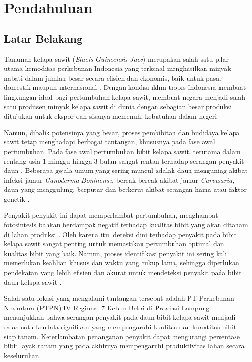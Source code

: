 \newpage
\chapter{Pendahuluan} \label{Bab I}

\section{Latar Belakang} \label{I.Latar Belakang}
Tanaman kelapa sawit (\textit{Elaeis Guineensis Jacq}) merupakan salah satu pilar utama komoditas perkebunan Indonesia yang terkenal menghasilkan minyak nabati dalam jumlah besar secara efisien dan ekonomis, baik untuk pasar domestik maupun internasional \cite{gaffar2024minyak}. Dengan kondisi iklim tropis Indonesia membuat lingkungan ideal bagi pertumbuhan kelapa sawit, membuat negara menjadi salah satu produsen minyak kelapa sawit di dunia  dengan sebagian besar produksi ditujukan untuk ekspor dan sisanya memenuhi kebutuhan dalam negeri \cite{saragih2022pengaruh}\cite{imaduddin2023analisa}.

Namun, dibalik potensinya yang besar, proses pembibitan dan budidaya kelapa sawit tetap menghadapi berbagai tantangan, khususnya pada fase awal pertumbuhan. Pada fase awal pertumbuhan bibit kelapa sawit, terutama dalam rentang usia 1 minggu hingga 3 bulan sangat rentan terhadap serangan penyakit daun \cite{syafrianda2024analisis}. Beberapa gejala umum yang sering muncul adalah daun menguning akibat infeksi jamur \textit {Ganoderma Boninense}, bercak-bercak akibat jamur \textit {Curvularia}, daun yang menggulung, berputar dan berkerut akibat serangan hama atau faktor genetik \cite{lisnawita2024peningkatan}\cite{harahap2024optimalisasi}\cite{napitupulu2022ta}\cite{marcelian2023identifikasi}. 

Penyakit-penyakit ini dapat memperlambat pertumbuhan, menghambat fotosintesis bahkan berdampak negatif terhadap kualitas bibit yang akan ditanam di lahan produksi \cite{marcelian2023identifikasi}. Oleh karena itu, deteksi dini terhadap penyakit pada bibit kelapa sawit sangat penting untuk memastikan pertumbuhan optimal dan kualitas bibit yang baik. Namun, proses identifikasi penyakit ini sering kali memerlukan keahlian khusus dan waktu yang cukup lama, sehingga diperlukan pendekatan yang lebih efisien dan akurat untuk mendeteksi penyakit pada bibit daun kelapa sawit \cite{pakiding2025implementasi}.

Salah satu lokasi yang mengalami tantangan tersebut adalah PT Perkebunan Nusantara (PTPN) IV Regional 7 Kebun Bekri di Provinsi Lampung menunjukkan bahwa serangan penyakit pada daun bibit kelapa sawit menjadi salah satu kendala signifikan yang mempengaruhi kualitas dan kuantitas bibit siap tanam. Keterlambatan penanganan penyakit dapat mengurangi persentase bibit layak tanam yang pada akhirnya mempengaruhi produktivitas lahan secara keseluruhan.

